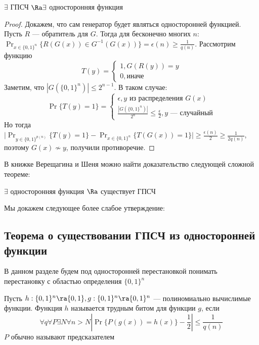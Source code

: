 \begin{theorem}
    \(\exists\) ГПСЧ \(\Ra \exists\) односторонняя функция
\end{theorem}
\begin{proof}
    Докажем, что сам генератор будет являться односторонней функцией. Пусть \(R\) --- обратитель для \(G\). Тогда для бесконечно многих \(n\): \(\Pr_{x \in \{0, 1\}^n}\{R(G(x)) \in G^{-1}(G(x))\} = \epsilon(n) \ge \frac{1}{q(n)}\). Рассмотрим функцию
    \[T(y) = \left\{\begin{array}{l}
        1, G(R(y)) = y \\
        0, \text{иначе}
    \end{array}\right.\]
    Заметим, что \(|G(\{0, 1\}^n)| \le 2^{n - 1}\). В таком случае:
    \[\Pr\{T(y) = 1\} = \left\{\begin{array}{l}
        \epsilon, y\text{ из распределения }G(x) \\
        \frac{|G(\{0, 1\}^n)|}{2^n} \le \frac{\epsilon}{2}, \text{\(y\) --- случайный}
    \end{array}\right.\]
    Но тогда \(\big|\Pr_{y \in \{0, 1\}^{p(n)}}\{T(y) = 1\} - \Pr_{x \in \{0, 1\}^{n}}\{T(G(x)) = 1\}\big| \ge \frac{\epsilon(n)}{2} \ge \frac{1}{2q(n)}\), поэтому \(G(x) \not\sim y\), получили противоречие.
\end{proof}


В книжке Верещагина и Шеня можно найти доказательство следующей сложной теореме:

\begin{theorem}[б/д]
    \(\exists\) односторонняя функция \(\Ra\) существует ГПСЧ
\end{theorem}

Мы докажем следующее более слабое утверждение:

\subsection{Теорема о существовании ГПСЧ из односторонней функции}

В данном разделе будем под односторонней перестановкой понимать перестановку с областью определения \(\{0, 1\}^n\)

\begin{definition}
    Пусть \(h: \{0, 1\}^n \ra \{0, 1\}, g: \{0, 1\}^n \ra \{0, 1\}^n\) --- полиномиально вычислимые функции. Функция \(h\) называется трудным битом для функции \(g\), если
    \[\forall q \forall P \exists N \forall n > N \left|\Pr\{P(g(x)) = h(x)\} - \frac{1}{2}\right| \le \frac{1}{q(n)}\]
    \(P\) обычно называют предсказателем
\end{definition}

